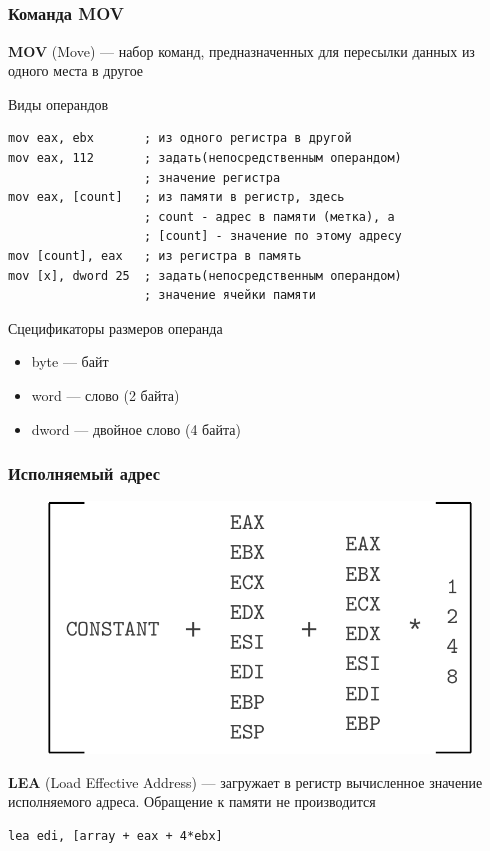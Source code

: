 \documentclass[utf8, russian]{beamer}
\begin{document}
    \subsection{}
    \begin{frame}[fragile]
        \frametitle{Команда MOV}
        {\bf MOV} (Move) --- набор команд, предназначенных для пересылки данных из одного места в другое
        \begin{block}{Виды операндов}\small
        \begin{verbatim}
mov eax, ebx       ; из одного регистра в другой
mov eax, 112       ; задать(непосредственным операндом)
                   ; значение регистра
mov eax, [count]   ; из памяти в регистр, здесь
                   ; count - адрес в памяти (метка), а
                   ; [count] - значение по этому адресу
mov [count], eax   ; из регистра в память
mov [x], dword 25  ; задать(непосредственным операндом)
                   ; значение ячейки памяти\end{verbatim}
        \end{block}
        \begin{block}{Сцецификаторы размеров операнда}\footnotesize
        \begin{itemize}
            \item byte --- байт
            \item word --- слово (2 байта)
            \item dword --- двойное слово (4 байта)
        \end{itemize}
        \end{block}
\end{frame}
    \begin{frame}[fragile]
        \frametitle{Исполняемый адрес}
        \begin{figure}
        \includegraphics[width=0.7\linewidth]{fig/effective_addr.pdf}
        \end{figure}
        {\bf LEA} (Load Effective Address) --- загружает в регистр вычисленное значение исполняемого адреса. Обращение к памяти не производится
        \begin{verbatim}
lea edi, [array + eax + 4*ebx]
        \end{verbatim}
\end{frame}
\end{document}
